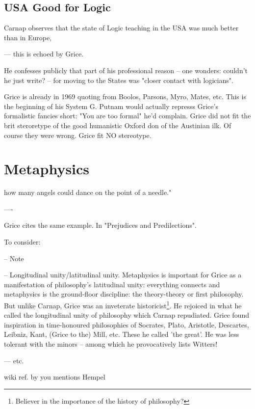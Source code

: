 \documentclass[10pt,titlepage]{book}
\begin{document}
\subsection{USA Good for Logic}

 Carnap observes that the state of Logic teaching in  the USA was much better than in Europe, 
 
--- this is echoed by Grice.
 
He confesses publicly that part of his professional reason -- one wonders:  
couldn't he just write? -- for moving to the States was "closer contact 
with  logicians".
 
Grice is already in 1969 quoting from Boolos, Parsons, Myro, Mates, etc.  
This is the beginning of his System G. Putnam would actually represss Grice's formalistic fancies short: "You are too formal" he'd complain.
Grice did not fit the brit steroretype of the good humanistic Oxford don of the 
Austinian ilk. Of  course they were wrong.
Grice fit NO stereotype.

\section{Metaphysics}

how many angels could dance on the point of a needle." 
 
----
 
Grice cites the same example.
In "Prejudices and Predilections".
 
To consider:
 
-- Note
 
-- Longitudinal unity/latitudinal unity.
Metaphysics is important for Grice as a manifestation of philosophy's latitudinal unity: everything connects and metaphysics is the ground-floor discipline: the theory-theory or first philosophy.
But unlike Carnap, Grice was an inveterate historicist\footnote{Believer in the importance of the history of philosophy?}. 
He rejoiced in what he called the longitudinal unity of philosophy which Carnap repudiated.
Grice found inspiration in time-honoured philosophies of Socrates, Plato, Aristotle, Descartes, Leibniz, Kant, (Grice to the) Mill, etc. 
These he called 'the great'.
He was less tolerant with the minors -- among which he provocatively lists Witters!
 
--- etc. 

wiki ref. by you mentions Hempel
 
\end{document}
